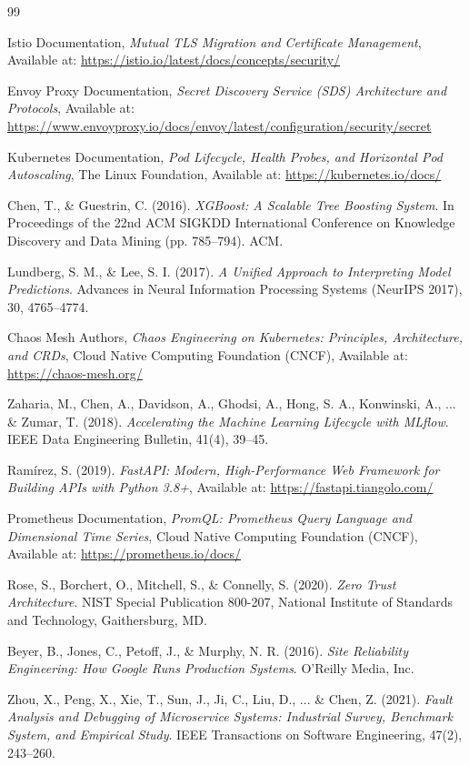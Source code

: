 \documentclass[12pt,a4paper]{report}
\begin{document}
\begin{thebibliography}{99}

Istio Documentation, \textit{Mutual TLS Migration and Certificate Management}, 
Available at: \url{https://istio.io/latest/docs/concepts/security/}

Envoy Proxy Documentation, \textit{Secret Discovery Service (SDS) Architecture and Protocols}, 
Available at: \url{https://www.envoyproxy.io/docs/envoy/latest/configuration/security/secret}

Kubernetes Documentation, \textit{Pod Lifecycle, Health Probes, and Horizontal Pod Autoscaling}, 
The Linux Foundation, Available at: \url{https://kubernetes.io/docs/}

Chen, T., \& Guestrin, C. (2016). \textit{XGBoost: A Scalable Tree Boosting System}. In Proceedings of the 22nd ACM SIGKDD International Conference on Knowledge Discovery and Data Mining (pp. 785--794). ACM.

Lundberg, S. M., \& Lee, S. I. (2017). \textit{A Unified Approach to Interpreting Model Predictions}. Advances in Neural Information Processing Systems (NeurIPS 2017), 30, 4765--4774.

Chaos Mesh Authors, \textit{Chaos Engineering on Kubernetes: Principles, Architecture, and CRDs}, 
Cloud Native Computing Foundation (CNCF), Available at: \url{https://chaos-mesh.org/}

Zaharia, M., Chen, A., Davidson, A., Ghodsi, A., Hong, S. A., Konwinski, A., ... \& Zumar, T. (2018). \textit{Accelerating the Machine Learning Lifecycle with MLflow}. IEEE Data Engineering Bulletin, 41(4), 39--45.

Ram{\'i}rez, S. (2019). \textit{FastAPI: Modern, High-Performance Web Framework for Building APIs with Python 3.8+}, 
Available at: \url{https://fastapi.tiangolo.com/}

Prometheus Documentation, \textit{PromQL: Prometheus Query Language and Dimensional Time Series}, 
Cloud Native Computing Foundation (CNCF), Available at: \url{https://prometheus.io/docs/}

Rose, S., Borchert, O., Mitchell, S., \& Connelly, S. (2020). \textit{Zero Trust Architecture}. NIST Special Publication 800-207, National Institute of Standards and Technology, Gaithersburg, MD.

Beyer, B., Jones, C., Petoff, J., \& Murphy, N. R. (2016). \textit{Site Reliability Engineering: How Google Runs Production Systems}. O'Reilly Media, Inc.

Zhou, X., Peng, X., Xie, T., Sun, J., Ji, C., Liu, D., ... \& Chen, Z. (2021). \textit{Fault Analysis and Debugging of Microservice Systems: Industrial Survey, Benchmark System, and Empirical Study}. IEEE Transactions on Software Engineering, 47(2), 243--260.

\end{thebibliography}
\end{document}
